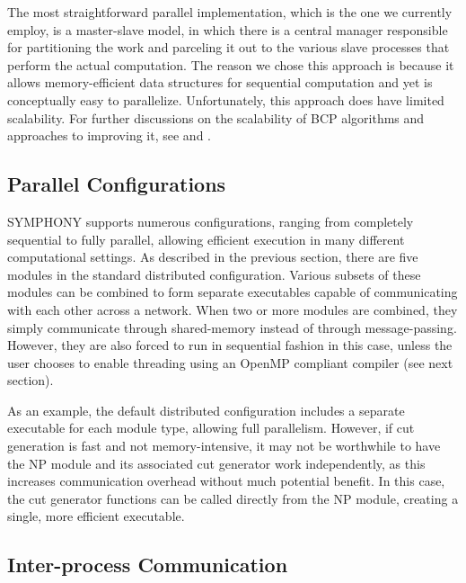 The most straightforward parallel implementation, which is the one we
currently employ, is a master-slave model, in which there is a central
manager responsible for partitioning the work and parceling it out to
the various slave processes that perform the actual computation. The
reason we chose this approach is because it allows memory-efficient
data structures for sequential computation and yet is conceptually
easy to parallelize. Unfortunately, this approach does have limited
scalability. For further discussions on the scalability of BCP algorithms and
approaches to improving it, see \cite{symphony1} and \cite{ALPS2}.


\subsection{Parallel Configurations}

SYMPHONY supports numerous configurations, ranging from completely
sequential to fully parallel, allowing efficient execution in many
different computational settings. As described in the previous
section, there are five modules in the standard distributed
configuration. Various subsets of these modules can be
combined to form separate executables capable of communicating
with each other across a network. When two or more modules are combined,
they simply communicate through shared-memory instead of through
message-passing. However, they are also forced to run in sequential
fashion in this case, unless the user chooses to enable threading
using an OpenMP compliant compiler (see next section). 

As an example, the default distributed configuration includes a
separate executable for each module type, allowing full parallelism.
However, if cut generation is fast and not memory-intensive,
it may not be worthwhile to have the NP module and its associated cut
generator work independently, as this increases communication
overhead without much potential benefit. In this case, the cut
generator functions can be called directly from the NP module,
creating a single, more efficient executable.

\subsection{Inter-process Communication}

